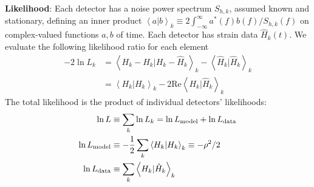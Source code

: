 \documentclass[twocolumn,prd,nofootinbib]{revtex4}
\newcommand\ForRichardOnly[1]{}
\newcommand\editremark[1]{{\color{red} #1}}
\newcommand\qmstateproduct[2]{\left\langle#1|#2\right\rangle}
\begin{document}
\noindent \textbf{Likelihood}: Each detector has a noise power spectrum $S_{h,k}$, assumed known and
stationary, defining an inner product $\qmstateproduct{a}{b}_k \equiv 2 \int_{-\infty}^\infty  a^*(f)b(f)/S_{h,k}(f)$ on
complex-valued functions $a,b$ of time.  Each detector has strain data $\hat{H}_k(t)$.  We evaluate the following likelihood ratio for each element
\begin{eqnarray}
-2\ln L_k &= \qmstateproduct{H_k-\hat{H}_k}{H_k-\hat{H}_k}_k - \qmstateproduct{\hat{H}_k}{\hat{H}_k}_k \\
  &= \qmstateproduct{H_k}{H_k}_k - 2 \text{Re} \qmstateproduct{H_k}{\hat{H}_k}_k 
\end{eqnarray}
The total likelihood is the product of individual detectors' likelihoods:
\begin{eqnarray}
\ln L &\equiv \sum_k \ln L_k  = \ln L_{\rm model} + \ln L_{\rm data} \\
\ln L_{\rm model} &\equiv -\frac{1}{2} \sum_k \qmstateproduct{H_k}{H_k}_k \equiv - \rho^2/2 \\
\ln L_{\rm data} &\equiv  \sum_k \qmstateproduct{H_k}{\hat{H}_k}_k 
\end{eqnarray}
\ForRichardOnly{
\begin{shaded}
\textbf{Efficiency of terms?}: As described below, the two terms in the log likelihood
\begin{itemize}
\item \emph{Model-only term}: This time-translation-independent $L_{\rm model}$ can be efficienly calculated from $\tilde{h}$ in the
  geocenter, for any sky location [Eq. \editremark{X}], from an O(N) operation.  To get $\tilde{h}$ in the geocenter for
  an arbitrary \emph{emission} direction, we need to sum over $\tilde{h}_{lm}(f)$ via
  Eq. (\ref{eq:def:hSpinWeightEmissionDirection})
\item \emph{Data term}: The other term can be efficiently computed for all times, sky locations, and emission directions
  by archiving $\qmstateproduct{h_{lm}\exp(-i\omega t)}{\hat{H}_k}$ timeseries [Eq. (\ref{eq:IndividualDetectorLikelihoodTimeseries:ViaSpinWeightBasis})].
\end{itemize}
\end{shaded}
}
\end{document}
